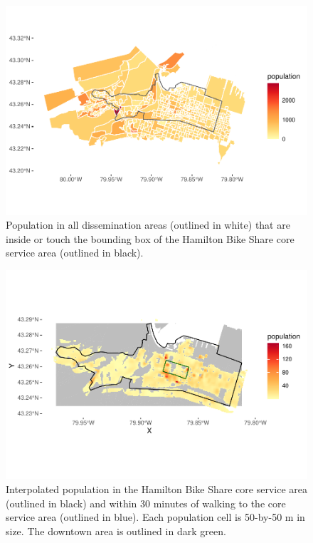 \documentclass[]{elsarticle} %
\begin{document}
\begin{figure}

{\centering \includegraphics[width=0.9\linewidth]{Bike-share-spatial-equity_files/figure-latex/da-population-1} 

}

\caption{Population in all dissemination areas (outlined in white) that are inside or touch the bounding box of the Hamilton Bike Share core service area (outlined in black).}\label{fig:da-population}
\end{figure}

\begin{figure}

{\centering \includegraphics[width=0.9\linewidth]{Bike-share-spatial-equity_files/figure-latex/interpolated-population-1} 

}

\caption{Interpolated population in the Hamilton Bike Share core service area (outlined in black) and within 30 minutes of walking to the core service area (outlined in blue). Each population cell is 50-by-50 m in size. The downtown area is outlined in dark green.}\label{fig:interpolated-population}
\end{figure}
\end{document}
